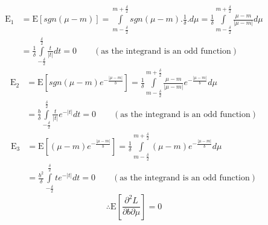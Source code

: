 \documentclass[wcp]{jmlr}
\begin{document}
\begin{align*}
 \mathrm{E}_1 &= \mathrm{E}[sgn(\mu-m)] = \int\limits_{m-\frac{\delta}{2}}^{m+\frac{\delta}{2}} sgn(\mu-m).\frac{1}{\delta}.d\mu = \frac{1}{\delta} \int\limits_{m-\frac{\delta}{2}}^{m+\frac{\delta}{2}} \frac{\mu-m}{|\mu-m|} d\mu \\
 &= \frac{1}{\delta} \int\limits_{-\frac{\delta}{2}}^{\frac{\delta}{2}} \frac{t}{|t|} dt = 0 \quad\quad(\mathrm{as\,\,the\,\,integrand\,\,is\,\,an\,\,odd\,\,function})
\end{align*}
\begin{align*}
 \mathrm{E}_2 &= \mathrm{E}[sgn(\mu-m)e^{-\frac{|\mu-m|}{b}}] = \frac{1}{\delta} \int\limits_{m-\frac{\delta}{2}}^{m+\frac{\delta}{2}} \frac{\mu-m}{|\mu-m|} e^{-\frac{|\mu-m|}{b}} d\mu \\
 &= \frac{b}{\delta} \int\limits_{-\frac{\delta}{2}}^{\frac{\delta}{2}} \frac{t}{|t|} e^{-|t|} dt = 0 \quad\quad(\mathrm{as\,\,the\,\,integrand\,\,is\,\,an\,\,odd\,\,function})
\end{align*}
\begin{align*}
 \mathrm{E}_3 &= \mathrm{E}[(\mu-m)e^{-\frac{|\mu-m|}{b}}] = \frac{1}{\delta} \int\limits_{m-\frac{\delta}{2}}^{m+\frac{\delta}{2}} (\mu-m)e^{-\frac{|\mu-m|}{b}} d\mu \\
 &= \frac{b^2}{\delta} \int\limits_{-\frac{\delta}{2}}^{\frac{\delta}{2}} t e^{-|t|} dt = 0 \quad\quad(\mathrm{as\,\,the\,\,integrand\,\,is\,\,an\,\,odd\,\,function})
\end{align*}
\begin{equation*} 
  \therefore \mathrm{E} \left[\frac{\partial^2 L}{\partial b \partial \mu}\right] = 0 
\end{equation*}
\end{document}
